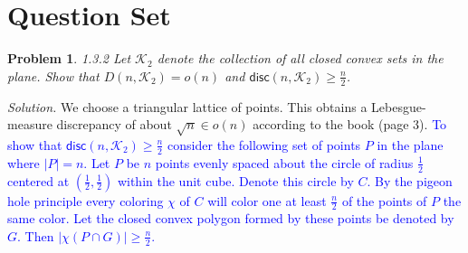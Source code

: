 \documentclass[11pt]{article}
\def\R{\mathbb{R}}
\newcommand\A{\mathcal{A}}
\newcommand\disc{\mathsf{disc}}
\newcommand\K{\mathcal{K}}
\newtheorem{problem}{Problem}
\begin{document}
\rhead{\today}

\section*{Question Set}

\begin{comment}
\begin{problem}
1.3.1 Prove: that if $D(n, \A) = o(n)$ and $D(n, \A) \geq f(n)$ for all $n$, with $\A$ a class of Lebesgue-measure sets in $\R^d$ containing a set $A_0$ with $[0,1]^d \subseteq A_0$ and $f$ satisfying $f(2n) \leq (2-\delta)f(n)$ for some fix $\delta > 0$, then $\disc(n, \A) \geq cf(n)$ holds for infinitely many $n$ with a suitable constant $c = c(\delta) > 0$.
\end{problem}
\begin{proof}

\end{proof}
\end{comment}


\begin{problem}
1.3.2 Let $\K_2$ denote the collection of all closed convex sets in the plane. Show that $D(n, \K_2) = o(n)$ and $\disc(n, \K_2) \geq \frac{n}{2}$.
\end{problem}
\emph{Solution.}
We choose a triangular lattice of points. This obtains a Lebesgue-measure discrepancy of about $\sqrt{n} \in o(n)$ according to the book (page 3). \textcolor{blue}{To show that $\disc(n, \K_2) \geq \frac{n}{2}$ consider the following set of points $P$ in the plane where $|P| = n$. Let $P$ be $n$ points evenly spaced about the circle of radius $\frac{1}{2}$ centered at $\left( \frac{1}{2}, \frac{1}{2} \right)$ within the unit cube. Denote this circle by $C$. By the pigeon hole principle every coloring $\chi$ of $C$ will color one at least $\frac{n}{2}$ of the points of $P$ the same color. Let the closed convex polygon formed by these points be denoted by $G$. Then $|\chi(P \cap G)| \geq \frac{n}{2}$.} 

\begin{comment}
\begin{problem}
\textcolor{blue}{
1.3.3 Find a class $\A$ of measurable sets in the plane such that $D(n, \A) = \Omega(n)$.}
\end{problem}
\emph{Solution.}
\end{comment}
\end{document}
